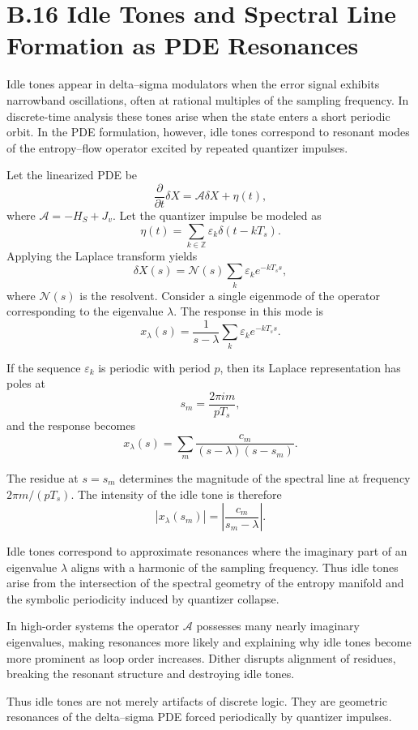 \section{B.16 Idle Tones and Spectral Line Formation as PDE Resonances}

Idle tones appear in delta–sigma modulators when the error signal exhibits narrowband oscillations, often at rational multiples of the sampling frequency. In discrete-time analysis these tones arise when the state enters a short periodic orbit. In the PDE formulation, however, idle tones correspond to resonant modes of the entropy–flow operator excited by repeated quantizer impulses.

Let the linearized PDE be
\[
\frac{\partial}{\partial t}\delta X
= \mathcal{A}\delta X + \eta(t),
\]
where \(\mathcal{A} = -H_{S} + J_{v}\). Let the quantizer impulse be modeled as
\[
\eta(t) = \sum_{k\in\mathbb{Z}} \varepsilon_{k}\delta(t - kT_{s}).
\]
Applying the Laplace transform yields
\[
\delta X(s) = \mathcal{N}(s)\sum_{k}\varepsilon_{k}e^{-kT_{s}s},
\]
where \(\mathcal{N}(s)\) is the resolvent. Consider a single eigenmode of the operator corresponding to the eigenvalue \(\lambda\). The response in this mode is
\[
x_{\lambda}(s)
= \frac{1}{s-\lambda}\sum_{k}\varepsilon_{k}e^{-kT_{s}s}.
\]

If the sequence \(\varepsilon_{k}\) is periodic with period \(p\), then its Laplace representation has poles at
\[
s_{m} = \frac{2\pi i m}{p T_{s}},
\]
and the response becomes
\[
x_{\lambda}(s) 
= \sum_{m} \frac{c_{m}}{(s-\lambda)(s - s_{m})}.
\]

The residue at \(s = s_{m}\) determines the magnitude of the spectral line at frequency \(2\pi m / (p T_{s})\). The intensity of the idle tone is therefore
\[
|x_{\lambda}(s_{m})| 
= \left|\frac{c_{m}}{s_{m}-\lambda}\right|.
\]

Idle tones correspond to approximate resonances where the imaginary part of an eigenvalue \(\lambda\) aligns with a harmonic of the sampling frequency. Thus idle tones arise from the intersection of the spectral geometry of the entropy manifold and the symbolic periodicity induced by quantizer collapse.

In high-order systems the operator \(\mathcal{A}\) possesses many nearly imaginary eigenvalues, making resonances more likely and explaining why idle tones become more prominent as loop order increases. Dither disrupts alignment of residues, breaking the resonant structure and destroying idle tones.

Thus idle tones are not merely artifacts of discrete logic. They are geometric resonances of the delta–sigma PDE forced periodically by quantizer impulses.

